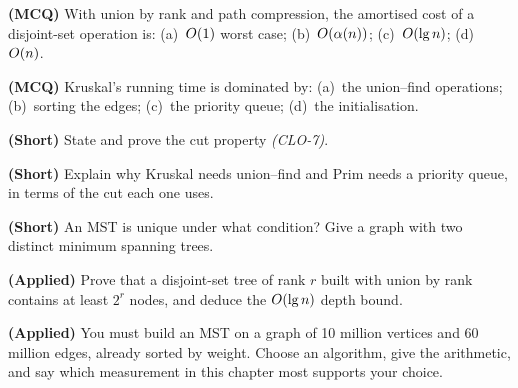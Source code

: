 \begin{reviewq}
  \item \textbf{(MCQ)} With union by rank and path compression, the amortised
        cost of a disjoint-set operation is: (a)~$O(1)$ worst case;
        (b)~$O(\alpha(n))$; (c)~$O(\operatorname{lg} n)$; (d)~$O(n)$.
  \item \textbf{(MCQ)} Kruskal's running time is dominated by:
        (a)~the union--find operations; (b)~sorting the edges; (c)~the
        priority queue; (d)~the initialisation.
  \item \textbf{(Short)} State and prove the cut property \emph{(CLO-7)}.
  \item \textbf{(Short)} Explain why Kruskal needs union--find and Prim needs a
        priority queue, in terms of the cut each one uses.
  \item \textbf{(Short)} An MST is unique under what condition? Give a graph
        with two distinct minimum spanning trees.
  \item \textbf{(Applied)} Prove that a disjoint-set tree of rank $r$ built with
        union by rank contains at least $2^{r}$ nodes, and deduce the
        $O(\operatorname{lg} n)$ depth bound.
  \item \textbf{(Applied)} You must build an MST on a graph of 10 million
        vertices and 60 million edges, already sorted by weight. Choose an
        algorithm, give the arithmetic, and say which measurement in this
        chapter most supports your choice.
\end{reviewq}
